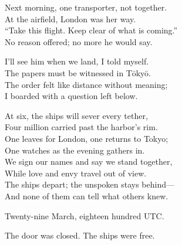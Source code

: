 \begin{lyrics}
Next morning, one transporter, not together.\\
At the airfield, London was her way.\\
“Take this flight. Keep clear of what is coming.”\\
No reason offered; no more he would say.

I’ll see him when we land, I told myself.\\
The papers must be witnessed in Tōkyō.\\
The order felt like distance without meaning;\\
I boarded with a question left below.

At six, the ships will sever every tether,\\
Four million carried past the harbor’s rim.\\
One leaves for London, one returns to Tokyo;\\
One watches as the evening gathers in.\\
We sign our names and say we stand together,\\
While love and envy travel out of view.\\
The ships depart; the unspoken stays behind—\\
And none of them can tell what others knew.

Twenty-nine March, eighteen hundred UTC.

The door was closed. The ships were free.
\end{lyrics}

